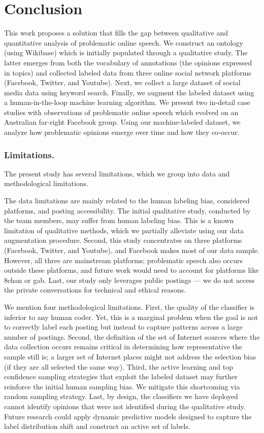 
\section{Conclusion}
This work proposes a solution that fills the gap between qualitative and quantitative analysis of problematic online speech.
We construct an ontology (using Wikibase) which is initially populated through a qualitative study.
The latter emerges from both the vocabulary of annotations (the opinions expressed in topics) and collected labeled data from three online social network platforms (Facebook, Twitter, and Youtube).
Next, we collect a large dataset of social media data using keyword search.
Finally, we augment the labeled dataset using a human-in-the-loop machine learning algorithm. 
We present two in-detail case studies with observations of problematic online speech which evolved on an Australian far-right Facebook group. 
Using our machine-labeled dataset, we analyze how problematic opinions emerge over time and how they co-occur.

\subsubsection{Limitations.}
The present study has several limitations, which we group into data and methodological limitations.

The data limitations are mainly related to the human labeling bias, considered platforms, and posting accessibility.
The initial qualitative study, conducted by the team members, may suffer from human labeling bias.
This is a known limitation of qualitative methods, which we partially alleviate using our data augmentation procedure.
Second, this study concentrates on three platforms (Facebook, Twitter, and Youtube), and Facebook makes most of our data sample.
However, all three are mainstream platforms; problematic speech also occurs outside these platforms, and future work would need to account for platforms like 8chan or gab.
Last, our study only leverages public postings --- we do not access the private conversations for technical and ethical reasons. 

We mention four methodological limitations.
First, the quality of the classifier is inferior to any human coder. 
Yet, this is a marginal problem when the goal is not to correctly label each posting but instead to capture patterns across a large number of postings. 
Second, the definition of the set of Internet sources where the data collection occurs remains critical in determining how representative the sample still is; a larger set of Internet places might not address the selection bias (if they are all selected the same way).
Third, the active learning and top confidence sampling strategies that exploit the labeled dataset may further reinforce the initial human sampling bias. 
We mitigate this shortcoming via random sampling strategy.
Last, by design, the classifiers we have deployed cannot identify opinions that were not identified during the qualitative study.
Future research could apply dynamic predictive models designed to capture the label distribution shift and construct an active set of labels.

